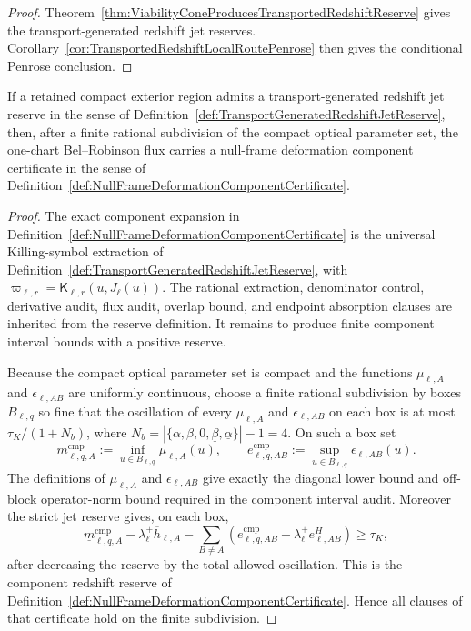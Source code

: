 \begin{proof}
Theorem~\ref{thm:ViabilityConeProducesTransportedRedshiftReserve} gives the
transport-generated redshift jet reserves.  Corollary~\ref{cor:TransportedRedshiftLocalRoutePenrose}
then gives the conditional Penrose conclusion.
\end{proof}

\begin{theorem}\label{thm:TransportedRedshiftJetsGiveComponentCertificate}
If a retained compact exterior region admits a transport-generated redshift jet
reserve in the sense of Definition~\ref{def:TransportGeneratedRedshiftJetReserve},
then, after a finite rational subdivision of the compact optical parameter set,
the one-chart Bel--Robinson flux carries a null-frame deformation component
certificate in the sense of
Definition~\ref{def:NullFrameDeformationComponentCertificate}.
\end{theorem}

\begin{proof}
The exact component expansion in
Definition~\ref{def:NullFrameDeformationComponentCertificate} is the universal
Killing-symbol extraction of
Definition~\ref{def:TransportGeneratedRedshiftJetReserve}, with
$\varpi_{\ell,r}=\mathsf K_{\ell,r}(u,J_\ell(u))$.  The rational extraction,
denominator control, derivative audit, flux audit, overlap bound, and endpoint
absorption clauses are inherited from the reserve definition.  It remains to
produce finite component interval bounds with a positive reserve.

Because the compact optical parameter set is compact and the functions
$\mu_{\ell,A}$ and $\epsilon_{\ell,AB}$ are uniformly continuous, choose a
finite rational subdivision by boxes $B_{\ell,q}$ so fine that the oscillation
of every $\mu_{\ell,A}$ and $\epsilon_{\ell,AB}$ on each box is at most
$\tau_K/(1+N_b)$, where
$N_b=|\{\alpha,\beta,0,\underline\beta,\underline\alpha\}|-1=4$.  On such a
box set
\[
    \underline m^{\mathrm{cmp}}_{\ell,q,A}
    :=
    \inf_{u\in B_{\ell,q}}\mu_{\ell,A}(u),
    \qquad
    e^{\mathrm{cmp}}_{\ell,q,AB}
    :=
    \sup_{u\in B_{\ell,q}}\epsilon_{\ell,AB}(u).
\]
The definitions of $\mu_{\ell,A}$ and $\epsilon_{\ell,AB}$ give exactly the
diagonal lower bound and off-block operator-norm bound required in the
component interval audit.  Moreover the strict jet reserve gives, on each box,
\[
    \underline m^{\mathrm{cmp}}_{\ell,q,A}
    -
    \lambda_\ell^+\overline h_{\ell,A}
    -
    \sum_{B\ne A}
    \left(
        e^{\mathrm{cmp}}_{\ell,q,AB}
        +
        \lambda_\ell^+e^H_{\ell,AB}
    \right)
    \ge
    \tau_K ,
\]
after decreasing the reserve by the total allowed oscillation.  This is the
component redshift reserve of
Definition~\ref{def:NullFrameDeformationComponentCertificate}.  Hence all
clauses of that certificate hold on the finite subdivision.
\end{proof}


